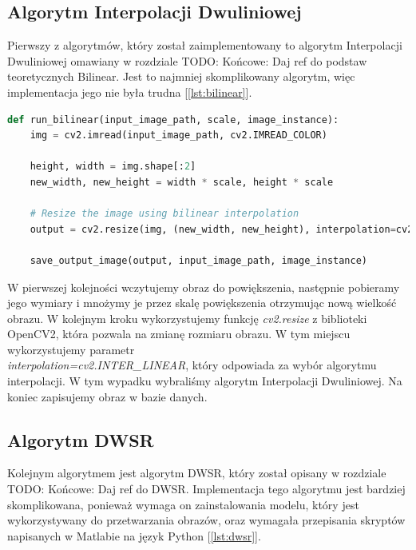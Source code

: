 \subsection*{Algorytm Interpolacji Dwuliniowej}

Pierwszy z algorytmów, który został zaimplementowany to algorytm Interpolacji Dwuliniowej omawiany w rozdziale
TODO: Końcowe: Daj ref do podstaw teoretycznych Bilinear.
Jest to najmniej skomplikowany algorytm, więc implementacja jego nie była trudna [\ref{lst:bilinear}].

\begin{lstlisting}[language=Python, caption=Implementacja algorytmu Bilinear., label={lst:bilinear}]
def run_bilinear(input_image_path, scale, image_instance):
    img = cv2.imread(input_image_path, cv2.IMREAD_COLOR)
    
    height, width = img.shape[:2]
    new_width, new_height = width * scale, height * scale

    # Resize the image using bilinear interpolation
    output = cv2.resize(img, (new_width, new_height), interpolation=cv2.INTER_LINEAR)

    save_output_image(output, input_image_path, image_instance)
\end{lstlisting}

W pierwszej kolejności wczytujemy obraz do powiększenia, następnie pobieramy jego wymiary i mnożymy je przez skalę powiększenia otrzymując nową wielkość obrazu. W kolejnym kroku wykorzystujemy funkcję \textit{cv2.resize} z biblioteki OpenCV2, która pozwala na zmianę rozmiaru obrazu. W tym miejscu wykorzystujemy parametr \\ \textit{interpolation=cv2.INTER\_LINEAR}, który odpowiada za wybór algorytmu interpolacji. W tym wypadku wybraliśmy algorytm Interpolacji Dwuliniowej. Na koniec zapisujemy obraz w bazie danych.


\subsection*{Algorytm DWSR}

Kolejnym algorytmem jest algorytm DWSR, który został opisany w rozdziale 
TODO: Końcowe: Daj ref do DWSR.
Implementacja tego algorytmu jest bardziej skomplikowana, ponieważ wymaga on zainstalowania modelu, który jest wykorzystywany do przetwarzania obrazów, oraz wymagała przepisania skryptów napisanych w Matlabie na język Python [\ref{lst:dwsr}].


